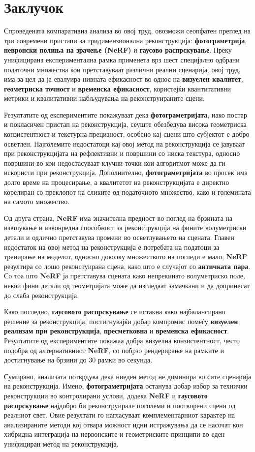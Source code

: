 \chapter{Заклучок}

Спроведената компаративна анализа во овој труд, овозможи сеопфатен преглед на три современи пристапи за тридимензионална реконструкција: \textbf{фотограметрија}, \textbf{невронски полиња на зрачење (NeRF)} и \textbf{гаусово распрскување}. Преку унифицирана експериментална рамка применета врз шест специјално одбрани податочни множества кои претставуваат различни реални сценарија, овој труд, има за цел да ја евалуира нивната ефикасност во однос на \textbf{визуелен квалитет}, \textbf{геометриска точност} и \textbf{временска ефикасност}, користејќи квантитативни метрики и квалитативни набљудувања на реконструираните сцени.

Резултатите од експериментите покажуваат дека \textbf{фотограметријата}, иако постар и покласичен пристап на реконструкција, сеуште обезбедува висока геометриска конзистентност и текстурна прецизност, особено кај сцени што субјектот е добро осветлен. Најголемите недостатоци кај овој метод на реконструкција се јавуваат при реконструкцијата на рефлективни и површини со ниска текстура, односно површини во кои недостасуваат клучни точки кои алгоритмот може да ги искористи при реконструкција. Дополнително, \textbf{фотограметријата} во просек има долго време на процесирање, а квалитетот на реконструкцијата е директно корелиран со преклопот на сликите од податочното множество, како и големината на самото множество.

Од друга страна, \textbf{NeRF} има значителна предност во поглед на брзината на извшување и извонредна способност за реконструкција на фините волуметриски детали и одлично претставува промени во осветлувањето на сцената. Главен недостаток на овој метод на реконструкција е потребата на податоци за тренирање на моделот, односно доколку множеството на погледи е мало, \textbf{NeRF} резултира со лошо реконстуирана сцена, како што е случајот со \textbf{античката пара}. Со тоа што \textbf{NeRF} ја претставува сцената како непрекинато волуметриско поле, некои фини детали од геометријата може да изгледаат замачкани и да допринесат до слаба реконструкција.

Како последно, \textbf{гаусовото распрскување} се истакна како најбалансирано решение за реконструкција, постигнувајќи добар компромис помеѓу \textbf{визуелен реализам при реконструкција}, \textbf{пресметковна} и \textbf{временска ефикасност}. Резултатите од експериментите покажаа добра визуелна конзистентност, често подобра од алтернативниот \textbf{NeRF}, со побрзо рендерирање на рамките и достигнување на брзини до 30 рамки во секунда.

Сумирано, анализата потврдува дека ниеден метод не доминира во сите сценарија на реконструкција. Имено, \textbf{фотограметријата} останува добар избор за технички реконструкции во контролирани услови, додека \textbf{NeRF} и \textbf{гаусовото распрскување} најдобро би реконструирале поголеми и поотворени сцени од реалниот свет. Овие резултати го нагласуваат комплементарниот карактер на анализираните методи кој отвара можност идни истражувања да се насочат кон хибридна интеграција на нервонските и геометриските принципи во еден унифициран метод на реконструкција.